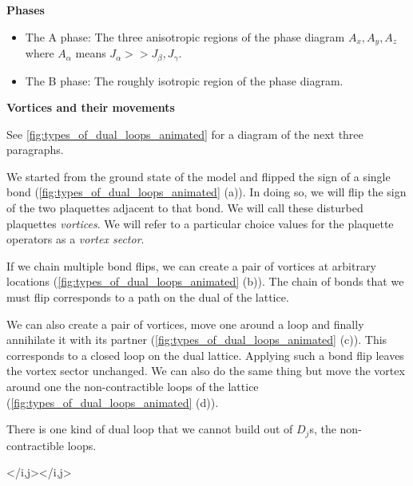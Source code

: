 \textbf{Phases}

\begin{itemize}
\tightlist
\item
  The A phase: The three anisotropic regions of the phase diagram \(A_x, A_y, A_z\) where \(A_\alpha\) means \(J_\alpha >> J_\beta, J_\gamma\).
\item
  The B phase: The roughly isotropic region of the phase diagram.
\end{itemize}

\textbf{Vortices and their movements}

See \cref{fig:types_of_dual_loops_animated} for a diagram of the next three paragraphs.

We started from the ground state of the model and flipped the sign of a single bond (\cref{fig:types_of_dual_loops_animated} (a)). In doing so, we will flip the sign of the two plaquettes adjacent to that bond. We will call these disturbed plaquettes \emph{vortices}. We will refer to a particular choice values for the plaquette operators as a \emph{vortex sector}.

If we chain multiple bond flips, we can create a pair of vortices at arbitrary locations (\cref{fig:types_of_dual_loops_animated} (b)). The chain of bonds that we must flip corresponds to a path on the dual of the lattice.

We can also create a pair of vortices, move one around a loop and finally annihilate it with its partner (\cref{fig:types_of_dual_loops_animated} (c)). This corresponds to a closed loop on the dual lattice. Applying such a bond flip leaves the vortex sector unchanged. We can also do the same thing but move the vortex around one the non-contractible loops of the lattice (\cref{fig:types_of_dual_loops_animated} (d)).

There is one kind of dual loop that we cannot build out of \(D_j\)s, the non-contractible loops.

\begin{Shaded}
\begin{Highlighting}[]

\end{Highlighting}
\end{Shaded}

\textless/i,j\textgreater\textless/i,j\textgreater{}
